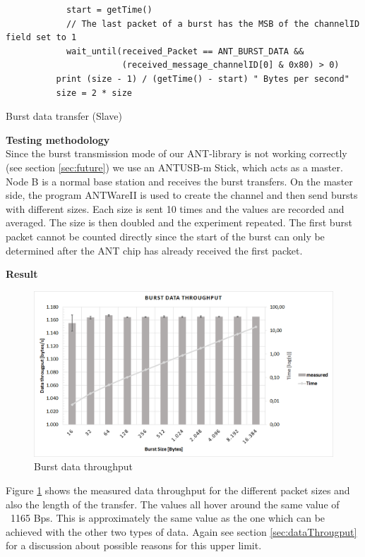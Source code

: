 \begin{description}
\begin{code}[H]
\begin{verbatim}
		    start = getTime()
		    // The last packet of a burst has the MSB of the channelID field set to 1
		    wait_until(received_Packet == ANT_BURST_DATA && 
		               (received_message_channelID[0] & 0x80) > 0)		    
		  print (size - 1) / (getTime() - start) " Bytes per second"
		  size = 2 * size
		\end{verbatim}
		\caption{Burst data transfer (Slave)}\label{lst:sExp5}
	\end{code}
	\item{\textbf{Testing methodology}} \hfill \\ Since the burst transmission mode of our ANT-library is not working correctly (see section \ref{sec:future}) we use an ANTUSB-m Stick, which acts as a master. Node B is a normal base station and receives the burst transfers. On the master side, the program ANTWareII \cite{ANTwareII} is used to create the channel and then send bursts with different sizes. Each size is sent 10 times and the values are recorded and averaged. The size is then doubled and the experiment repeated. The first burst packet cannot be counted directly since the start of the burst can only be determined after the ANT chip has already received the first packet.
	\newpage
	\item{\textbf{Result}} \hfill \\ 
	\begin{figure}[H]
		\centering
		\includegraphics[scale=0.5]{content/images/exp5.png}
		\caption{Burst data throughput}\label{fig:exp5}
	\end{figure}
	Figure \ref{fig:exp5} shows the measured data throughput for the different packet sizes and also the length of the transfer. The values all hover around the same value of ~1165 Bps. This is approximately the same value as the one which can be achieved with the other two types of data.
	Again see section \ref{sec:dataThrougput} for a discussion about possible reasons for this upper limit. 
\end{description}
\newpage


